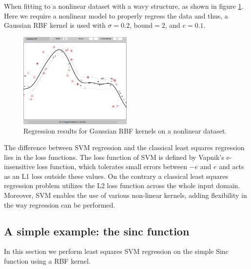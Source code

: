 \documentclass{article}
\begin{document}
        When fitting to a nonlinear dataset with a wavy structure, as shown in figure \ref{fig:gauss_rbf}. Here we require a nonlinear model to properly regress the data and thus, a Gaussian RBF kernel is used with $\sigma=0.2$, bound$=2$, and $e=0.1$. 
        \begin{figure}[h]
             \centering
             \centering
             \includegraphics[width=0.5\textwidth]{Assignment 2/figures/1_1/gauss_rbf_sig_0_2_b_2_e_0_1.png}
            \caption{Regression results for Gaussian RBF kernels on a nonlinear dataset.}
            \label{fig:gauss_rbf}
        \end{figure}
        
    
        The difference between SVM regression and the classical least squares regression lies in the loss functions. The loss function of SVM is defined by Vapnik's e-insensitive loss function, which tolerates small errors between $-e$ and $e$ and acts as an L1 loss outside these values. On the contrary a classical least squares regression problem utilizes the L2 loss function across the whole input domain. Moreover, SVM enables the use of various non-linear kernels, adding flexibility in the way regression can be performed.
    
    \subsection{A simple example: the sinc function}
        In this section we perform least squares SVM regression on the simple Sinc function using a RBF kernel.
        
\end{document}
